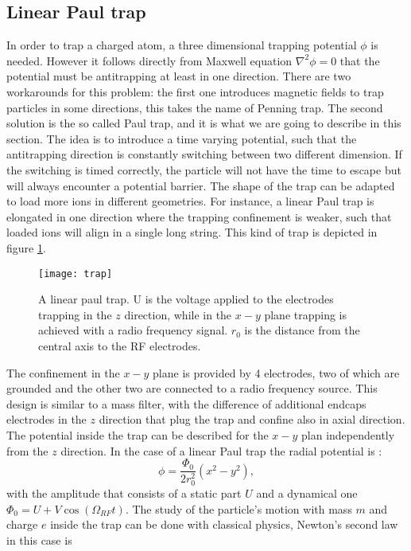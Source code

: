 \subsection{Linear Paul trap}
In order to trap a charged atom, a three dimensional trapping potential $\phi$ is needed. However it follows directly from Maxwell equation $\nabla^2 \phi = 0$ that the potential must be antitrapping at least in one direction. There are two workarounds for this problem: the first one introduces magnetic fields to trap particles in some directions, this takes the name of Penning trap. The second solution is the so called Paul trap, and it is what we are going to describe in this section. The idea is to introduce a time varying potential, such that the antitrapping direction is constantly switching between two  different dimension. If the switching is timed correctly, the particle will not have the time to escape but will always encounter a potential barrier.
The shape of the trap can be adapted to load more ions in different geometries. For instance, a linear Paul trap is elongated in one direction where the trapping confinement is weaker, such that loaded ions will align in a single long string. This kind of trap is depicted in figure \ref{trap}.
\begin{figure}[H]
\centering
\texttt{[image: trap]}
\caption{A linear paul trap. U is the voltage applied to the electrodes trapping in the $z$ direction, while in the $x-y$ plane trapping is achieved with a radio frequency signal. $r_0$ is the distance from the central axis to the RF electrodes.}
\label{trap}
\end{figure}
The confinement in the $x-y$ plane is provided by 4 electrodes, two of which are grounded and the other two are connected to a radio frequency source. This design is similar to a mass filter, with the difference of additional endcaps electrodes in the $z$ direction that plug the trap and confine also in axial direction.\\
The potential inside the trap can be described for the $x-y$ plan independently from the $z$ direction. In the case of a linear Paul trap the radial potential is \cite{traptheory}:
\begin{equation}
\phi  = \frac{\Phi_0}{2r_0^2}\left(x^2 - y^2\right),
\end{equation}
with the amplitude that consists of a static part $U$ and a dynamical one $\Phi_0 = U + V \cos(\Omega_{RF} t)$.
The study of the particle's motion with mass $m$ and charge $e$ inside the trap can be done with classical physics, Newton's second law in this case is
